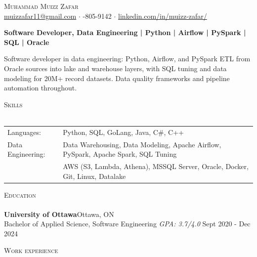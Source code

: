 \documentclass[a4paper]{article}
\newcommand{\lineunder} {
    \vspace*{-8pt} \\
    \hspace*{-18pt} \hrulefill \\
}
\newcommand{\header} [1] {
    {\hspace*{-18pt}\vspace*{6pt} \textsc{#1}}
    \vspace*{-6pt} \lineunder
}
\begin{document}
\vspace*{-40pt}

\vspace*{-10pt}
\begin{center}
	{\Huge \scshape {Muhammad Muizz Zafar}}\\
	\faSend \space \href{mailto:muizzafar11@gmail.com}{muizzafar11@gmail.com} $\cdot$ \faPhoneSquare {}-805-9142 $\cdot$ \faLinkedinSquare \space \href{https://www.linkedin.com/in/muizz-zafar/}{linkedin.com/in/muizz-zafar/}
	\\
\end{center}

\vspace{-5pt}
\begin{center}
\textbf{Software Developer, Data Engineering | Python | Airflow | PySpark | SQL | Oracle}
\end{center}
\begin{center}
Software developer in data engineering: Python, Airflow, and PySpark ETL from Oracle sources into lake and warehouse layers, with SQL tuning and data modeling for 20M+ record datasets. Data quality frameworks and pipeline automation throughout.
\end{center}

\header{Skills}
\begin{tabular}{ l l }
	Languages: 
& Python, SQL, GoLang, Java, C\#, C++ \\

Data Engineering: 
& Data Warehousing, Data Modeling, Apache Airflow, PySpark, Apache Spark, SQL Tuning\\
& AWS (S3, Lambda, Athena), MSSQL Server, Oracle, Docker, Git, Linux, Datalake

\end{tabular}

\header{Education}
\textbf{University of Ottawa}\hfill Ottawa, ON\\
Bachelor of Applied Science, Software Engineering \textit{GPA: 3.7/4.0} \hfill Sept 2020 - Dec 2024\\
\vspace{2mm}

\header{Work experience}
\vspace{1.5mm}
\end{document}
